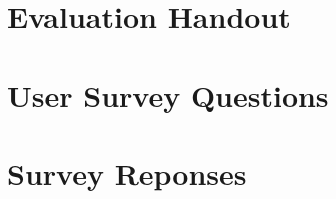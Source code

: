 \begin{appendices}

\chapter{Evaluation Handout}\label{appendix:handout}


\chapter{User Survey Questions}\label{appendix:questions}


\chapter{Survey Reponses}\label{appendix:responses}


\end{appendices}
